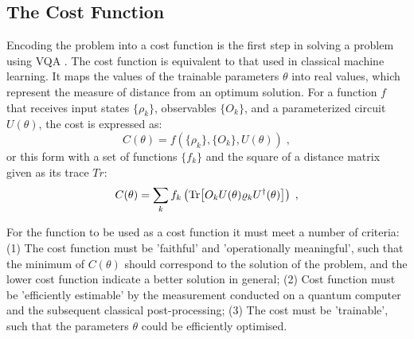 \subsection{The Cost Function} \label{Sec: The Cost Function}
Encoding the problem into a cost function is the first step in solving a problem using VQA \cite{cerezo2021variational}.
The cost function is equivalent to that used in classical machine learning.
It maps the values of the trainable parameters $\theta$ into real values, which represent the measure of distance from an optimum solution.
For a function $f$ that receives input states $\{\rho_k\}$, observables $\{O_k\}$, and a parameterized circuit $U(\theta)$, the cost is expressed as:
\begin{equation}
    C(\theta) = f(\{\rho_k\}, \{O_k\}, U(\theta)) \;,
\end{equation}
or this form with a set of functions $\{ f_k \}$ and the square of a distance matrix given as its trace $Tr$:
\begin{equation}
    C(\theta) = \sum_k f_k \left(\Tr[ O_k U(\theta) \varrho_k U^\dagger(\theta) ]\right) \;,
    \label{Eqn: Cost function}
\end{equation}

For the function to be used as a cost function it must meet a number of criteria:
(1) The cost function must be 'faithful' and 'operationally meaningful', such that the minimum of $C(\theta)$ should correspond to the solution of the problem, and the lower cost function indicate a better solution in general;
(2) Cost function must be 'efficiently estimable' by the measurement conducted on a quantum computer and the subsequent classical post-processing;
(3) The cost must be 'trainable', such that the parameters $\theta$ could be efficiently optimised.